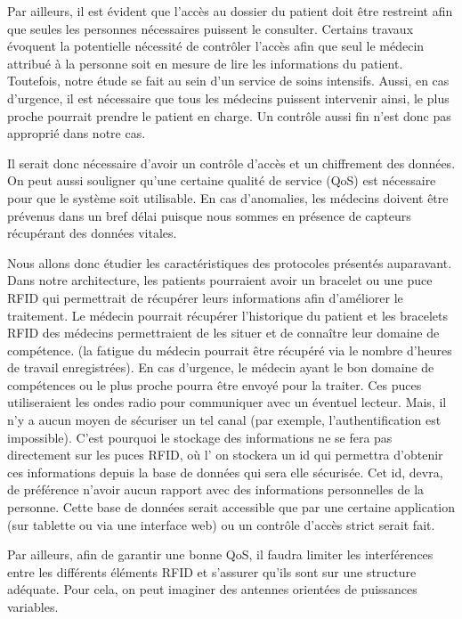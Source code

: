 \documentclass{article}
\begin{document}
Par ailleurs, il est évident que l’accès au dossier du patient doit être restreint afin que seules les personnes nécessaires puissent le consulter. Certains travaux évoquent la potentielle nécessité de contrôler l’accès afin que seul le médecin attribué à la personne soit en mesure de lire les informations du patient. Toutefois, notre étude se fait au sein d’un service de soins intensifs. Aussi, en cas d’urgence, il est nécessaire que tous les médecins puissent intervenir ainsi, le plus proche pourrait prendre le patient en charge. Un contrôle aussi fin n’est donc pas approprié dans notre cas.

Il serait donc nécessaire d’avoir un contrôle d’accès et un chiffrement des données. On peut aussi souligner qu’une certaine qualité de service (QoS) est nécessaire pour que le système soit utilisable. En cas d’anomalies, les médecins doivent être prévenus dans un bref délai puisque nous sommes en présence de capteurs récupérant des données vitales. 

Nous allons donc étudier les caractéristiques des protocoles présentés auparavant.
\\

Dans notre architecture, les patients pourraient avoir un bracelet ou une puce RFID qui permettrait de récupérer leurs informations afin d’améliorer le traitement. Le médecin pourrait récupérer l’historique du patient et les bracelets RFID des médecins permettraient de les situer et de connaître leur domaine de compétence. (la fatigue du médecin pourrait être récupéré via le nombre d’heures de travail enregistrées). En cas d’urgence, le médecin ayant le bon domaine de compétences ou le plus proche pourra être envoyé pour la traiter. Ces puces utiliseraient les ondes radio pour communiquer avec un éventuel lecteur. Mais, il n’y a aucun moyen de sécuriser un tel canal (par exemple, l’authentification est impossible). C'est pourquoi le stockage des informations ne se fera pas directement sur les puces RFID, où l' on stockera un id qui permettra d’obtenir ces informations depuis la base de données qui sera elle sécurisée. Cet id, devra, de préférence n’avoir aucun rapport avec des informations personnelles de la personne. Cette base de données serait accessible que par une certaine application (sur tablette ou via une interface web) ou un contrôle d’accès strict serait fait.

Par ailleurs, afin de garantir une bonne QoS, il faudra limiter les interférences entre les différents éléments RFID et s’assurer qu’ils sont sur une structure adéquate. Pour cela, on peut imaginer des antennes orientées de puissances variables. 
\\
\end{document}

